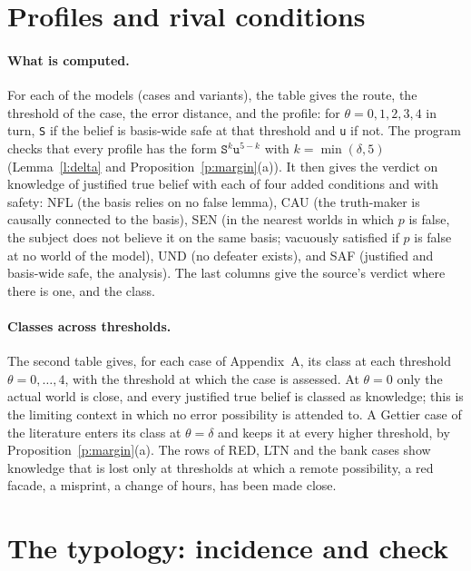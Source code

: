 \documentclass{situationist-preprint}
\begin{document}


\section{Profiles and rival conditions}\label{app:c}

\paragraph{What is computed.} For each of the \stnmodels{} models (cases and variants), the table gives the route, the threshold of the case, the error distance, and the profile: for $\theta = 0, 1, 2, 3, 4$ in turn, \texttt{S} if the belief is basis-wide safe at that threshold and \texttt{u} if not. The program checks that every profile has the form $\texttt{S}^k\texttt{u}^{5-k}$ with $k = \min(\delta, 5)$ (Lemma~\ref{l:delta} and Proposition~\ref{p:margin}(a)). It then gives the verdict on knowledge of justified true belief with each of four added conditions and with safety: NFL (the basis relies on no false lemma), CAU (the truth-maker is causally connected to the basis), SEN (in the nearest worlds in which $p$ is false, the subject does not believe it on the same basis; vacuously satisfied if $p$ is false at no world of the model), UND (no defeater exists), and SAF (justified and basis-wide safe, the analysis). The last columns give the source's verdict where there is one, and the class.



\paragraph{Classes across thresholds.} The second table gives, for each case of Appendix~A, its class at each threshold $\theta = 0, \ldots, 4$, with the threshold at which the case is assessed. At $\theta = 0$ only the actual world is close, and every justified true belief is classed as knowledge; this is the limiting context in which no error possibility is attended to. A Gettier case of the literature enters its class at $\theta = \delta$ and keeps it at every higher threshold, by Proposition~\ref{p:margin}(a). The rows of RED, LTN and the bank cases show knowledge that is lost only at thresholds at which a remote possibility, a red facade, a misprint, a change of hours, has been made close.



\section{The typology: incidence and check}\label{app:d}
\end{document}
